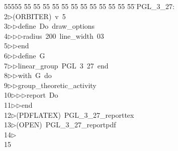 %
%
\begin{tabbing}
55555 \= 55 \= 55 \= 55 \= 55 \= 55 \= 55 \= 55 \= 55 \= 55 \= 55 \= 55 \= 55 \= \>PGL\_3\_27:\\[0pt]
2\>$\triangleright$\>(ORBITER)\ v\ 5\ \\[0pt]
3\>$\triangleright$\>$\triangleright$\>define\ Do\ draw\_options\ \\[0pt]
4\>$\triangleright$\>$\triangleright$\>$\triangleright$\>radius\ 200\ line\_width\ 03\ \\[0pt]
5\>$\triangleright$\>$\triangleright$\>end\ \\[0pt]
6\>$\triangleright$\>$\triangleright$\>define\ G\ \\[0pt]
7\>$\triangleright$\>$\triangleright$\>linear\_group\ PGL\ 3\ 27\ end\ \\[0pt]
8\>$\triangleright$\>$\triangleright$\>with\ G\ do\ \\[0pt]
9\>$\triangleright$\>$\triangleright$\>group\_theoretic\_activity\ \\[0pt]
10\>$\triangleright$\>$\triangleright$\>$\triangleright$\>report\ Do\ \\[0pt]
11\>$\triangleright$\>$\triangleright$\>end\\[0pt]
12\>$\triangleright$\>(PDFLATEX)\ PGL\_3\_27\_reporttex\\[0pt]
13\>$\triangleright$\>(OPEN)\ PGL\_3\_27\_reportpdf\\[0pt]
14\>$\triangleright$\>\\[0pt]
15\>\end{tabbing}
